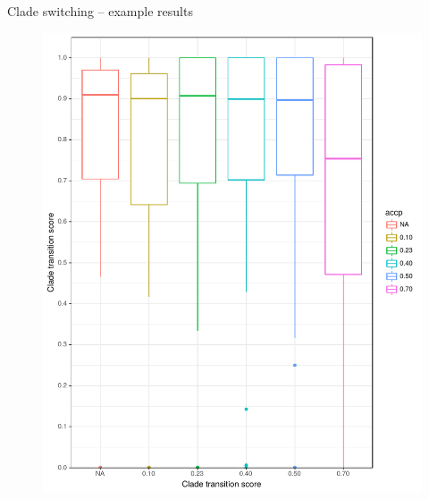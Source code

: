 \documentclass[newPxFont,numfooter,sectionpages]{beamer}
\begin{document}
\begin{frame}{Clade switching -- example results}
\begin{figure}
	\includegraphics[scale=0.35]{figures/clade_transitions_denv17taxa.pdf} 
\end{figure}
\end{frame}
\end{document}
